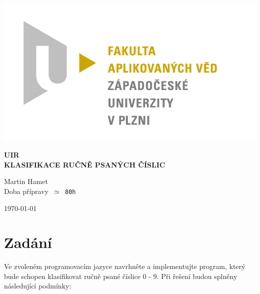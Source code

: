 \documentclass[12pt]{article}
\begin{document}
\begin{titlepage}
\includegraphics[scale=0.2, trim=5cm 0 0 30cm]{logo.jpg}
\begin{center}
\vspace{5cm}
{\Huge
\textbf{UIR}\\
\vspace{1cm}
}
{\Large
\textbf{KLASIFIKACE RUČNĚ PSANÝCH ČÍSLIC}
}
\end{center}
\vspace{\fill}

\begin{minipage}[t]{5cm}
\flushleft
Martin Hamet\\
Doba přípravy\texttt{ $\simeq$ 80h}
\end{minipage}
\hfill
\begin{minipage}[t]{7cm}
\flushright
\today
\end{minipage}
\end{titlepage}

\tableofcontents
\newpage
\section{Zadání}
\label{zadani}
Ve zvoleném programovacím jazyce navrhněte a implementujte program, který bude
schopen klasifikovat ručně psané číslice 0 - 9. Při řešení budou splněny následující podmínky:
\end{document}
